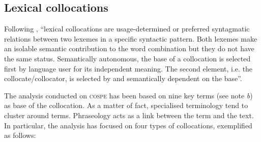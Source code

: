 \documentclass[output=paper]{LSP/langsci}
\begin{document}
\subsection{Lexical collocations}
Following \citet[43]{Granger2008}, “lexical collocations are usage-determined or preferred syntagmatic relations between two lexemes in a specific syntactic pattern. Both lexemes make an isolable semantic contribution to the word combination but they do not have the same status. Semantically autonomous, the base of a collocation is selected first by language user for its independent meaning. The second element, i.e. the collocate/collocator, is selected by and semantically dependent on the base”.

The analysis conducted on \textsc{cospe} has been based on nine key terms (see note \textit{b}) as base of the collocation. As a matter of fact, specialised terminology tend to cluster around terms. Phraseology acts as a link between the term and the text. In particular, the analysis has focused on four types of collocations, exemplified as follows:
\end{document}
